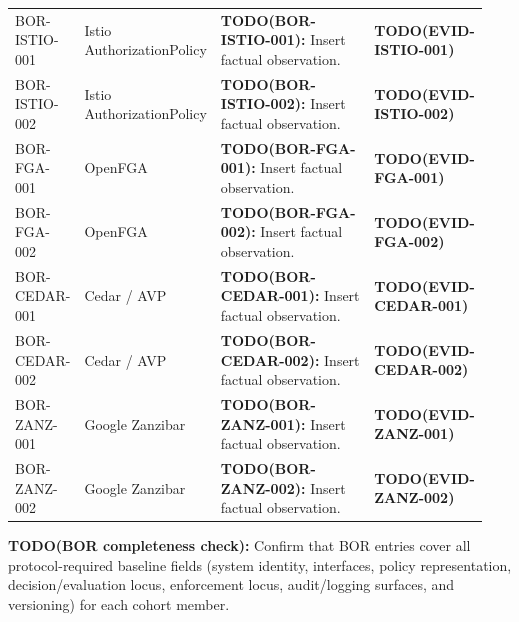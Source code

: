 \begin{center}
\begin{longtable}{@{}p{0.12\linewidth}p{0.16\linewidth}p{0.46\linewidth}p{0.20\linewidth}@{}}
BOR-ISTIO-001 & Istio AuthorizationPolicy & \textbf{TODO(BOR-ISTIO-001):} Insert factual observation. & \textbf{TODO(EVID-ISTIO-001)} \\
BOR-ISTIO-002 & Istio AuthorizationPolicy & \textbf{TODO(BOR-ISTIO-002):} Insert factual observation. & \textbf{TODO(EVID-ISTIO-002)} \\

BOR-FGA-001 & OpenFGA & \textbf{TODO(BOR-FGA-001):} Insert factual observation. & \textbf{TODO(EVID-FGA-001)} \\
BOR-FGA-002 & OpenFGA & \textbf{TODO(BOR-FGA-002):} Insert factual observation. & \textbf{TODO(EVID-FGA-002)} \\

BOR-CEDAR-001 & Cedar / AVP & \textbf{TODO(BOR-CEDAR-001):} Insert factual observation. & \textbf{TODO(EVID-CEDAR-001)} \\
BOR-CEDAR-002 & Cedar / AVP & \textbf{TODO(BOR-CEDAR-002):} Insert factual observation. & \textbf{TODO(EVID-CEDAR-002)} \\

BOR-ZANZ-001 & Google Zanzibar & \textbf{TODO(BOR-ZANZ-001):} Insert factual observation. & \textbf{TODO(EVID-ZANZ-001)} \\
BOR-ZANZ-002 & Google Zanzibar & \textbf{TODO(BOR-ZANZ-002):} Insert factual observation. & \textbf{TODO(EVID-ZANZ-002)} \\
\end{longtable}
\end{center}

\textbf{TODO(BOR completeness check):} Confirm that BOR entries cover all protocol-required baseline fields (system identity, interfaces, policy representation, decision/evaluation locus, enforcement locus, audit/logging surfaces, and versioning) for each cohort member.
